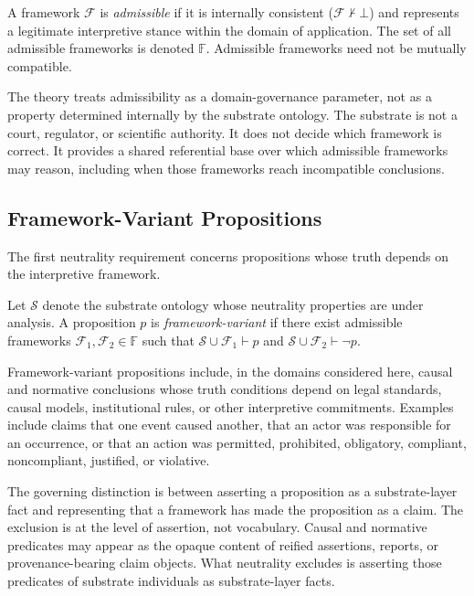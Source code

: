 \begin{definition}
\label{def:admissible-framework}
A framework $\mathcal{F}$ is \emph{admissible}
if it is internally consistent
($\mathcal{F} \not\vdash \bot$)
and represents a legitimate interpretive stance
within the domain of application.
The set of all admissible frameworks is denoted $\mathbb{F}$.
Admissible frameworks need not be mutually compatible.
\end{definition}

The theory treats admissibility as a domain-governance parameter,
not as a property determined internally by the substrate ontology.
The substrate is not a court, regulator, or scientific authority.
It does not decide which framework is correct.
It provides a shared referential base over which admissible frameworks
may reason, including when those frameworks reach incompatible conclusions.

\subsection{Framework-Variant Propositions}
\label{subsec:framework-variant}

The first neutrality requirement concerns propositions
whose truth depends on the interpretive framework.

\begin{definition}
\label{def:framework-variant}
Let $\mathcal{S}$ denote the substrate ontology whose neutrality
properties are under analysis.
A proposition $p$ is \emph{framework-variant}
if there exist admissible frameworks
$\mathcal{F}_1, \mathcal{F}_2 \in \mathbb{F}$
such that
$\mathcal{S} \cup \mathcal{F}_1 \vdash p$
and
$\mathcal{S} \cup \mathcal{F}_2 \vdash \neg p$.
\end{definition}

Framework-variant propositions include, in the domains considered here,
causal and normative conclusions whose truth conditions depend on
legal standards, causal models, institutional rules,
or other interpretive commitments.
Examples include claims that one event caused another,
that an actor was responsible for an occurrence,
or that an action was permitted, prohibited, obligatory,
compliant, noncompliant, justified, or violative.

The governing distinction is between asserting a proposition
as a substrate-layer fact and representing that a framework
has made the proposition as a claim.
The exclusion is at the level of assertion, not vocabulary.
Causal and normative predicates may appear as the opaque content
of reified assertions, reports, or provenance-bearing claim objects.
What neutrality excludes is asserting those
predicates of substrate individuals as substrate-layer facts.

